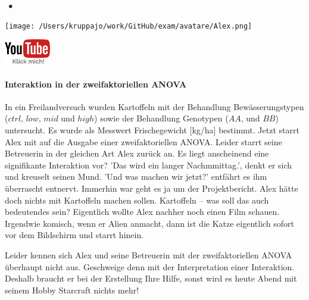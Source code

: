 \documentclass[a4paper, 9pt]{scrartcl}\usepackage[]{graphicx}\usepackage[]{xcolor}
\begin{document}
 
\ifcollection
\begin{flushright}
\tiny\vspace{-3Ex}
\textbf{\examinhaltstart}
\exammodulestatversuch $\;\bullet$
\exammodulebiostat
\vspace{-4Ex}
\end{flushright}
\begin{minipage}[t]{0.5\textwidth}
\texttt{[image: /Users/kruppajo/work/GitHub/exam/avatare/Alex.png]}
\end{minipage}
\begin{minipage}[t]{0.5\textwidth}
\hfill
\href{https://youtu.be/-yJWhI3Uy5g}{\includegraphics[width = 2cm]{img/youtube}}
\end{minipage}
\vspace{-3Ex}
\fi



\ifcollection
\paragraph{Interaktion in der zweifaktoriellen ANOVA}
\fi

In ein Freilandversuch wurden Kartoffeln mit der Behandlung Bewässerungstypen ($ctrl$, $low$, $mid$ und $high$) sowie der Behandlung Genotypen ($AA$, und $BB$) untersucht. Es wurde als Messwert Frischegewicht [kg/ha] bestimmt. Jetzt starrt Alex mit auf die \Rlogo Ausgabe einer zweifaktoriellen ANOVA. Leider starrt seine Betreuerin in der gleichen Art Alex zurück an. Es liegt anscheinend eine signifikante Interaktion vor? 'Das wird ein langer Nachmmittag.', denkt er sich und kreuselt seinen Mund. 'Und was machen wir jetzt?' entfährt es ihm überrascht entnervt. Immerhin war geht es ja um der Projektbericht. Alex hätte doch nichts mit Kartoffeln machen sollen. Kartoffeln -- was soll das auch bedeutendes sein? Eigentlich wollte Alex nachher noch einen Film schauen. Irgendwie komisch, wenn er Alien anmacht, dann ist die Katze eigentlich sofort vor dem Bildschirm und starrt hinein.

\vspace{1ex}

Leider kennen sich Alex und seine Betreuerin mit der zweifaktoriellen ANOVA überhaupt nicht aus. Geschweige denn mit der Interpretation einer Interaktion. Deshalb braucht er bei der Erstellung Ihre Hilfe, sonst wird es heute Abend mit seinem Hobby Starcraft nichts mehr! 
\end{document}
